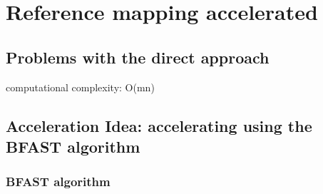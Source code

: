 
\chapter{Reference mapping accelerated}

\section{Problems with the direct approach}

computational complexity: O(mn)

\section{Acceleration Idea: accelerating using the BFAST algorithm}

\subsection{BFAST algorithm}
